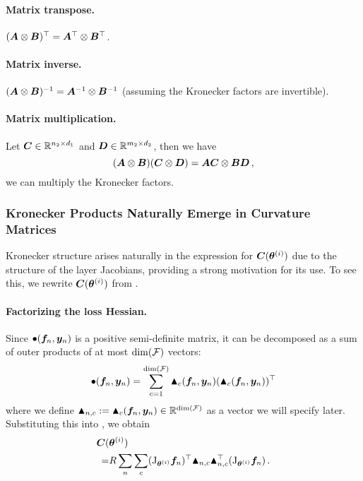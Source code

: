 \paragraph{Matrix transpose.} $({\bm{A}} \otimes {\bm{B}})^{\top} = {\bm{A}}^{\top} \otimes {\bm{B}}^{\top}$.

\paragraph{Matrix inverse.} $({\bm{A}} \otimes {\bm{B}})^{-1} = {\bm{A}}^{-1} \otimes {\bm{B}}^{-1}$ (assuming the Kronecker factors are invertible).

\paragraph{Matrix multiplication.}
Let ${\bm{C}} \in \mathbb{R}^{n_2 \times d_1}$ and ${\bm{D}} \in \mathbb{R}^{m_2 \times d_2}$, then we have
$$ ({\bm{A}} \otimes {\bm{B}})({\bm{C}} \otimes {\bm{D}}) = {\bm{A}} {\bm{C}} \otimes {\bm{B}} {\bm{D}}\,, $$ \ie we can multiply the Kronecker factors.

\subsubsection{Kronecker Products Naturally Emerge in Curvature Matrices}

Kronecker structure arises naturally in the expression for ${\bm{C}}({\bm{\theta}}^{(i)})$ due to the structure of the layer Jacobians, providing a strong motivation for its use.
To see this, we rewrite ${\bm{C}}({\bm{\theta}}^{(i)})$ from .

\paragraph{Factorizing the loss Hessian.}
Since $\bullet({\bm{f}}_n, {\bm{y}}_n)$ is a positive semi-definite matrix, it can be decomposed as a sum of outer products of at most $\dim({\mathcal{F}})$ vectors: $$\bullet({\bm{f}}_n, {\bm{y}}_n) = \sum_{c=1}^{\dim({\mathcal{F}})} \blacktriangle_c({\bm{f}}_n, {\bm{y}}_n) (\blacktriangle_c({\bm{f}}_n, {\bm{y}}_n))^{\top}$$
where we define $\blacktriangle_{n,c} := \blacktriangle_c({\bm{f}}_n, {\bm{y}}_n) \in {\mathbb{R}}^{\dim({\mathcal{F}})}$ as a vector we will specify later.
Substituting this into , we obtain
\begin{align*}
  {\bm{C}}(&{\bm{\theta}}^{(i)}) \\
  =&
     R \sum_n \sum_{c}
     (\mathrm{J}_{{\bm{\theta}}^{(i)}} {\bm{f}}_n)^{\top}
     \blacktriangle_{n,c} \blacktriangle_{n,c}^{\top}
     (\mathrm{J}_{{\bm{\theta}}^{(i)}} {\bm{f}}_n)\,.
\end{align*}

